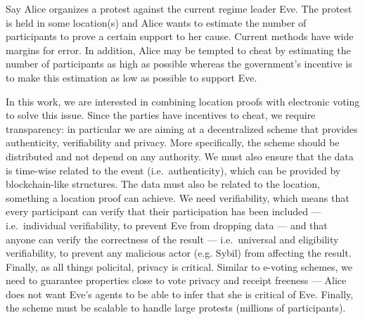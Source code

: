 Say Alice organizes a protest against the current regime leader Eve.
The protest is held in some location(s) and Alice wants to estimate the number 
of participants to prove a certain support to her cause.
Current methods have wide margins for error.
In addition, Alice may be tempted to cheat by estimating the number of 
participants as high as possible whereas the government's incentive is to make 
this estimation as low as possible to support Eve.
                                                                                  
In this work, we are interested in combining location proofs with electronic 
voting to solve this issue.
Since the parties have incentives to cheat, we require transparency: in 
particular we are aiming at a decentralized scheme that provides authenticity, 
verifiability and privacy.
More specifically, the scheme should be distributed and not depend on any 
authority.
We must also ensure that the data is time-wise related to the event (i.e.\ 
authenticity), which can be provided by blockchain-like structures.
The data must also be related to the location, something a location proof can 
achieve.
We need verifiability, which means that every participant can verify that their 
participation has been included --- i.e.\ individual verifiability, to prevent 
Eve from dropping data --- and that anyone can verify the correctness of the 
result --- i.e.\ universal and eligibility verifiability, to prevent any 
malicious actor (e.g. Sybil) from affecting the result.
Finally, as all things policital, privacy is critical.
Similar to e-voting schemes, we need to guarantee properties close to vote 
privacy and receipt freeness --- Alice does not want Eve's agents to be able to 
infer that she is critical of Eve.
Finally, the scheme must be scalable to handle large protests (millions of 
participants).


